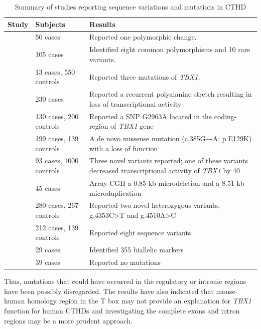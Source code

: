 \begin{refsection}
\begin{landscape}
\begin{table}[!p]
\centering
\caption{Summary of studies reporting sequence variations and mutations in CTHD}
\label{tab:4.2summary}
\begin{tabular}{  l  l  l  }
\toprule
	\textbf{Study} & \textbf{Subjects} & \textbf{Results} \\ \toprule
	\cite{Cabuk2007} & 50 cases & Reported one polymorphic change. \\ \midrule
	\cite{gong2001mutation} & 105 cases & Identified eight common polymorphisms and 10 rare variants. \\ \midrule
	\cite{yagi2003role} & 13 cases, 550 controls & Reported three mutations of \textit{TBX1}; \\ \midrule
	\cite{rauch2004assessment} & 230 cases & Reported a recurrent polyalanine stretch resulting in loss of transcriptional activity \\ \midrule
	\cite{han2006single} & 130 cases, 200 controls & Reported a SNP G2963A located in the coding-region of \textit{TBX1} gene \\ \midrule
	\cite{xu2014novel} & 199 cases, 139 controls & A de novo missense mutation (c.385G→A; p.E129K) with a loss of function \\ \midrule
	\cite{griffin2010systematic} & 93 cases, 1000 controls & Three novel variants reported; one of these variants decreased transcriptional activity  of \textit{TBX1} by 40 \\ \midrule
	\cite{chen2014microdeletions} & 45 cases & Array CGH a 0.85 kb microdeletion and a 8.51 kb microduplication \\ \midrule
	\cite{wang2012genetic} & 280 cases, 267 controls & Reported two novel heterozygous variants, g.4353C>T and g.4510A>C \\ \midrule
	\cite{xu2011detecting} & 212 cases, 139 controls & Reported eight sequence variants \\ \midrule
	\cite{heike2010single} & 29 cases & Identified 355 biallelic markers \\ \midrule
	\cite{voelckel2004allelic} & 39 cases & Reported no mutations \\ \bottomrule
\end{tabular}
\end{table}
\end{landscape}



 Thus, mutations that could have occurred in the regulatory or intronic regions have been possibly disregarded. The results have also indicated that mouse-human homology region in the T box may not provide an explanation for \textit{TBX1} function for human CTHDs and investigating the complete exons and intron regions may be a more prudent approach. 


\end{refsection}
